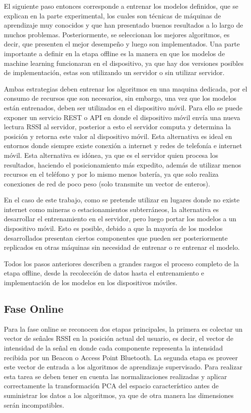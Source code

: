 El siguiente paso entonces corresponde a entrenar los modelos definidos, que se explican en la parte experimental, los cuales son técnicas de máquinas de aprendizaje muy conocidos y que han presentado buenos resultados a lo largo de muchos problemas. Posteriormente, se seleccionan los mejores algoritmos, es decir, que presenten el mejor desempeño y luego son implementados. Una parte importante a definir en la etapa offline es la manera en que los modelos de machine learning funcionaran en el dispositivo, ya que hay dos versiones posibles de implementación, estas son utilizando un servidor o sin utilizar servidor. 

Ambas estrategias deben entrenar los algoritmos en una maquina dedicada, por el consumo de recursos que son necesarios, sin embargo, una vez que los modelos están entrenados, deben ser utilizados en el dispositivo móvil. Para ello se puede exponer un servicio REST o API en donde el dispositivo móvil envía una nueva lectura RSSI al servidor, posterior a esto el servidor computa y determina la posición y retorna este valor al dispositivo móvil. Esta alternativa es ideal en entornos donde siempre existe conexión a internet y redes de telefonía e internet móvil. Esta alternativa es idónea, ya que es el servidor quien procesa los resultados, haciendo el posicionamiento más expedito, además de utilizar menos recursos en el teléfono y por lo mismo menos batería, ya que solo realiza conexiones de red de poco peso (solo transmite un vector de enteros).

En el caso de este trabajo, como se pretende utilizar en lugares donde no existe internet como mineras o estacionamientos subterráneos, la alternativa es desarrollar el entrenamiento en el servidor, pero luego portar los modelos a un dispositivo móvil. Esto es posible, debido a que la mayoría de los modelos desarrollados presentan ciertos componentes que pueden ser posteriormente replicados en otras máquinas sin necesidad de entrenar o re entrenar el modelo. 

Todos los pasos anteriores describen a grandes rasgos el proceso completo de la etapa offline, desde la recolección de datos hasta el entrenamiento e implementación de los modelos en los dispositivos móviles.

\subsection{Fase Online}

Para la fase online se reconocen dos etapas principales, la primera es colectar un vector de señales RSSI en la posición actual del usuario, es decir, el vector de intensidad de la señal en donde cada componente representa la intensidad recibida por un Beacon o Access Point Bluetooth. La segunda etapa es proveer este vector de entrada a los algoritmos de aprendizaje supervisado. Para realizar esta tarea se deben tener en cuenta las normalizaciones realizadas y aplicar correctamente la transformación PCA del espacio característico antes de suministrar los datos a los algoritmos, ya que de otra manera las dimensiones serán incompatibles.

